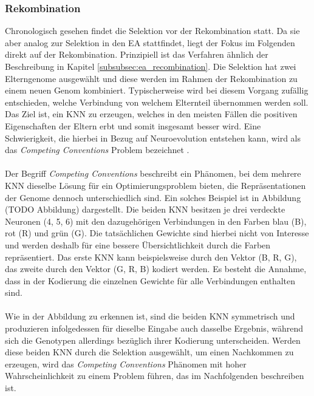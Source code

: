 \subsubsection{Rekombination}
\label{subsubsec}
Chronologisch gesehen findet die Selektion vor der Rekombination statt. Da sie aber analog zur Selektion in den \ac{EA} stattfindet, liegt der Fokus im Folgenden direkt auf der Rekombination. Prinzipiell ist das Verfahren ähnlich der Beschreibung in Kapitel \ref{subsubsec:ea_recombination}. Die Selektion hat zwei Elterngenome ausgewählt und diese werden im Rahmen der Rekombination zu einem neuen Genom kombiniert. Typischerweise wird bei diesem Vorgang zufällig entschieden, welche Verbindung von welchem Elternteil übernommen werden soll. Das Ziel ist, ein \ac{KNN} zu erzeugen, welches in den meisten Fällen die positiven Eigenschaften der Eltern erbt und somit insgesamt besser wird. Eine Schwierigkeit, die hierbei in Bezug auf Neuroevolution entstehen kann, wird als das \emph{Competing Conventions} Problem bezeichnet \cite{stanley2002evolving}.
\\\\ %
Der Begriff \emph{Competing Conventions} beschreibt ein Phänomen, bei dem mehrere \ac{KNN} dieselbe Lösung für ein Optimierungsproblem bieten, die Repräsentationen der Genome dennoch unterschiedlich sind. Ein solches Beispiel ist in Abbildung (TODO Abbildung) dargestellt. Die beiden \ac{KNN} besitzen je drei verdeckte Neuronen (4, 5, 6) mit den dazugehörigen Verbindungen in den Farben blau (B), rot (R) und grün (G). Die tatsächlichen Gewichte sind hierbei nicht von Interesse und werden deshalb für eine bessere Übersichtlichkeit durch die Farben repräsentiert. Das erste \ac{KNN} kann beispielsweise durch den Vektor (B, R, G), das zweite durch den Vektor  (G, R, B) kodiert werden. Es besteht die Annahme, dass in der Kodierung die einzelnen Gewichte für alle Verbindungen enthalten sind. \\\\
Wie in der Abbildung zu erkennen ist, sind die beiden \ac{KNN} symmetrisch und produzieren infolgedessen für dieselbe Eingabe auch dasselbe Ergebnis, während sich die Genotypen allerdings bezüglich ihrer Kodierung unterscheiden. Werden diese beiden \ac{KNN} durch die Selektion ausgewählt, um einen Nachkommen zu erzeugen, wird das \emph{Competing Conventions} Phänomen mit hoher Wahrscheinlichkeit zu einem Problem führen, das im Nachfolgenden beschreiben ist. 
\\\\
